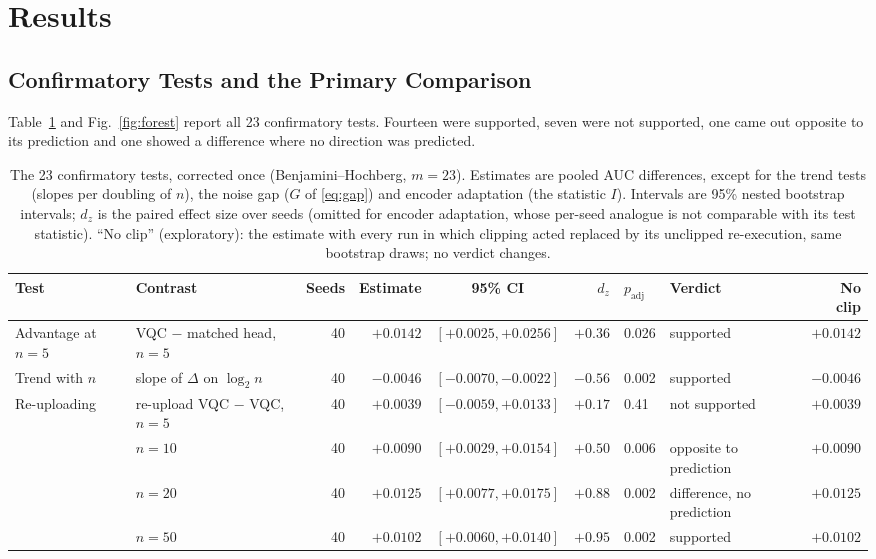 \documentclass{ieeeaccess}
\newcommand{\vqc}{VQC}
\begin{document}
\section{Results}
\label{sec:results}

\subsection{Confirmatory Tests and the Primary Comparison}
\label{sec:primary}
Table~\ref{tab:family} and Fig.~\ref{fig:forest} report all 23 confirmatory tests. Fourteen were supported, seven were not supported, one came out opposite to its prediction and one showed a difference where no direction was predicted.

\begin{table}[t]
\caption{The 23 confirmatory tests, corrected once (Benjamini--Hochberg, $m=23$). Estimates are pooled AUC differences, except for the trend tests (slopes per doubling of $n$), the noise gap ($G$ of \eqref{eq:gap}) and encoder adaptation (the statistic $I$). Intervals are 95\% nested bootstrap intervals; $d_z$ is the paired effect size over seeds (omitted for encoder adaptation, whose per-seed analogue is not comparable with its test statistic). ``No clip'' (exploratory): the estimate with every run in which clipping acted replaced by its unclipped re-execution, same bootstrap draws; no verdict changes.}
\label{tab:family}
\centering
\setlength{\tabcolsep}{4pt}
\footnotesize
\begin{tabular}{@{}llrrcrllr@{}}
\toprule
Test & Contrast & Seeds & Estimate & 95\% CI & $d_z$ & $p_{\mathrm{adj}}$ & Verdict & No clip\\
\midrule
Advantage at $n=5$ & \vqc{} $-$ matched head, $n=5$ & 40 & $+0.0142$ & $[+0.0025, +0.0256]$ & $+0.36$ & 0.026 & supported & $+0.0142$\\
Trend with $n$ & slope of $\Delta$ on $\log_2 n$ & 40 & $-0.0046$ & $[-0.0070, -0.0022]$ & $-0.56$ & 0.002 & supported & $-0.0046$\\
\midrule
Re-uploading & re-upload \vqc{} $-$ \vqc{}, $n=5$ & 40 & $+0.0039$ & $[-0.0059, +0.0133]$ & $+0.17$ & 0.41 & not supported & $+0.0039$\\
 & \quad $n=10$ & 40 & $+0.0090$ & $[+0.0029, +0.0154]$ & $+0.50$ & 0.006 & opposite to prediction & $+0.0090$\\
 & \quad $n=20$ & 40 & $+0.0125$ & $[+0.0077, +0.0175]$ & $+0.88$ & 0.002 & difference, no prediction & $+0.0125$\\
 & \quad $n=50$ & 40 & $+0.0102$ & $[+0.0060, +0.0140]$ & $+0.95$ & 0.002 & supported & $+0.0102$\\

\end{tabular}
\end{table}
\end{document}
